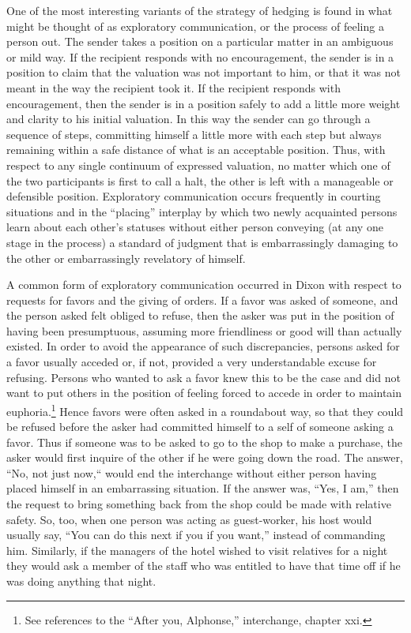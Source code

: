 \documentclass[openany,nobib]{tufte-book}
\begin{document}
One of the most interesting variants of the strategy of hedging is found
in what might be thought of as exploratory communication, or the process
of feeling a person out. The sender takes a position on a particular
matter in an ambiguous or mild way. If the recipient responds with no
encouragement, the sender is in a position to claim that the valuation
was not important to him, or that it was not meant in the way the
recipient took it. If the recipient responds with encouragement, then
the sender is in a position safely to add a little more weight and
clarity to his initial valuation. In this way the sender can go through
a sequence of steps, committing himself a little more with each step but
always remaining within a safe distance of what is an acceptable
position. Thus, with respect to any single continuum of expressed
valuation, no matter which one of the two participants is first to call
a halt, the other is left with a manageable or defensible position.
Exploratory communication occurs frequently in courting situations and
in the ``placing'' interplay by which two newly acquainted persons learn
about each other's statuses without either person conveying (at any one
stage in the process) a standard of judgment that is embarrassingly
damaging to the other or embarrassingly revelatory of himself.

A common form of exploratory communication occurred in Dixon with
respect to requests for favors and the giving of orders. If a favor was
asked of someone, and the person asked felt obliged to refuse, then the
asker was put in the position of having been presumptuous, assuming more
friendliness or good will than actually existed. In order to avoid the
appearance of such discrepancies, persons asked for a favor usually
acceded or, if not, provided a very understandable excuse for refusing.
Persons who wanted to ask a favor knew this to be the case and did not
want to put others in the position of feeling forced to accede in order
to maintain euphoria.\footnote{See references to the ``After you,
  Alphonse,'' interchange, chapter xxi.} Hence favors were often asked
in a roundabout way, so that they could be refused before the asker had
committed himself to a self of someone asking a favor. Thus if someone
was to be asked to go to the shop to make a purchase, the asker would
first inquire of the other if he were going down the road. The answer,
``No, not just now,`` would end the interchange without either person
having placed himself in an embarrassing situation. If the answer was,
``Yes, I am,'' then the request to bring something back from the shop
could be made with relative safety. So, too, when one person was acting
as guest-worker, his host would usually say, ``You can do this next if
you if you want,'' instead of commanding him. Similarly, if the managers
of the hotel wished to visit relatives for a night they would ask a
member of the staff who was entitled to have that time off if he was
doing anything that night.
\end{document}
